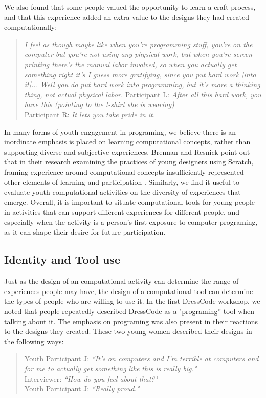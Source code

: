 \documentclass{sigchi}
\begin{document}
We also found that some people valued the opportunity to learn a craft process, and that this experience added an extra value to the designs they had created computationally:
\begin{quote}
\textit{I feel as though maybe like when you're programming stuff, you're on the computer but you're not using any physical work, but when you're screen printing there's the manual labor involved, so when you actually get something right it's I guess more gratifying, since you put hard work [into it]... Well you do put hard work into programming, but it's more a thinking thing, not actual physical labor.}
Participant L: \textit{After all this hard work, you have this (pointing to the t-shirt she is wearing)}
\\Participant R: \textit{It lets you take pride in it.}
\end{quote}

In many forms of youth engagement in programing, we believe there is an inordinate emphasis is placed on learning computational concepts, rather than supporting diverse and subjective experiences. Brennan and Resnick point out that in their research examining the practices of young designers using Scratch, framing experience around computational concepts insufficiently represented other elements of learning and participation \cite{computational_thinking}. Similarly, we find it useful to evaluate youth computational activities on the diversity of experiences that emerge. Overall, it is important to situate computational tools for young people in activities that can support different experiences for different people, and especially when the activity is a person's first exposure to computer programing, as it can shape their desire for future participation. 

\subsection{Identity and Tool use}
Just as the design of an computational activity can determine the range of experiences people may have, the design of a computational tool can determine the types of people who are willing to use it. In the first DressCode workshop, we noted that people repeatedly described DressCode as a "programing'' tool when talking about it. The emphasis on programing was also present in their reactions to the designs they created. These two young women described their designs in the following ways:
 \begin{quote}
Youth Participant J: \textit{``It's on computers and I'm terrible at computers and for me to actually get something like this is really big."} 
\\Interviewer: \textit{``How do you feel about that?"}
\\Youth Participant J: \textit{``Really proud."} 
\end{quote}
\end{document}
